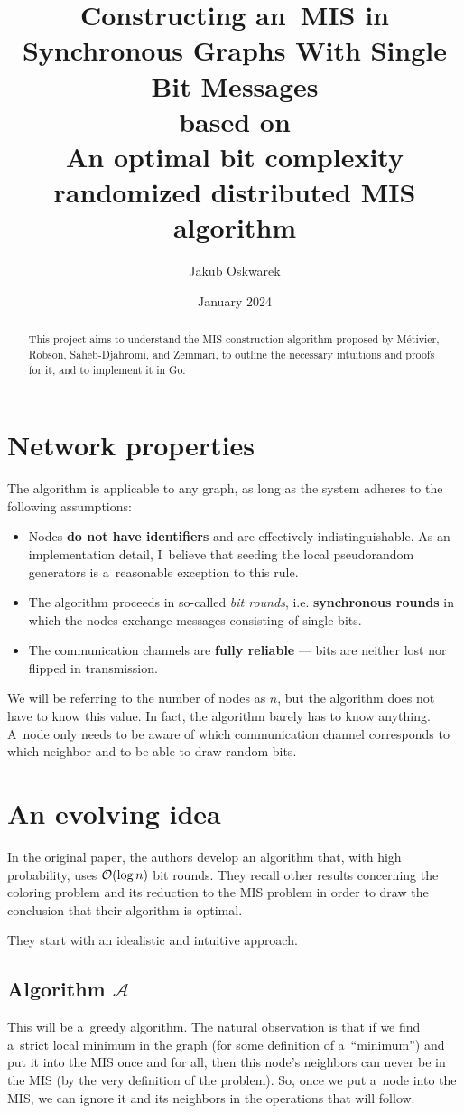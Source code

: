 \documentclass{article}
\title{%
    Constructing an~MIS in Synchronous Graphs With Single Bit Messages\\%
    \normalsize based on\\%
    \large An optimal bit complexity randomized distributed MIS algorithm%
}
\author{Jakub Oskwarek}
\date{January 2024}
\DeclarePairedDelimiter{\parenthesesdelimiter}{(}{)}
\def\pars{\parenthesesdelimiter*}
\newcommand{\bigO}{\mathcal{O}}
\begin{document}
\maketitle
\begin{abstract}
This project aims to understand the MIS construction algorithm proposed by Métivier, Robson, Saheb-Djahromi, and Zemmari, to outline the necessary intuitions and proofs for it, and to implement it in Go.
\end{abstract}

\section{Network properties}
The algorithm \cite{Metivier2011} is applicable to any graph, as long as the system adheres to the following assumptions:
\begin{itemize}
    \item Nodes \textbf{do not have identifiers} and are effectively indistinguishable. As an implementation detail, I~believe that seeding the local pseudorandom generators is a~reasonable exception to this rule.
    \item The algorithm proceeds in so-called \emph{bit rounds}, i.e. \textbf{synchronous rounds} in which the nodes exchange messages consisting of single bits.
    \item The communication channels are \textbf{fully reliable} --- bits are neither lost nor flipped in transmission.
\end{itemize}
We will be referring to the number of nodes as \(n\), but the algorithm does not have to know this value. In fact, the algorithm barely has to know anything. A~node only needs to be aware of which communication channel corresponds to which neighbor and to be able to draw random bits.

\section{An evolving idea}
In the original paper, the authors develop an algorithm that, with high probability, uses \(\bigO\pars{\log n}\) bit rounds. They recall other results concerning the coloring problem and its reduction to the MIS problem in order to draw the conclusion that their algorithm is optimal.

They start with an idealistic and intuitive approach.
\subsection{Algorithm \texorpdfstring{\(\mathcal{A}\)}{A}}
This will be a~greedy algorithm. The natural observation is that if we find a~strict local minimum in the graph (for some definition of a~``minimum'') and put it into the MIS once and for all, then this node's neighbors can never be in the MIS (by the very definition of the problem). So, once we put a~node into the MIS, we can ignore it and its neighbors in the operations that will follow.
\end{document}
